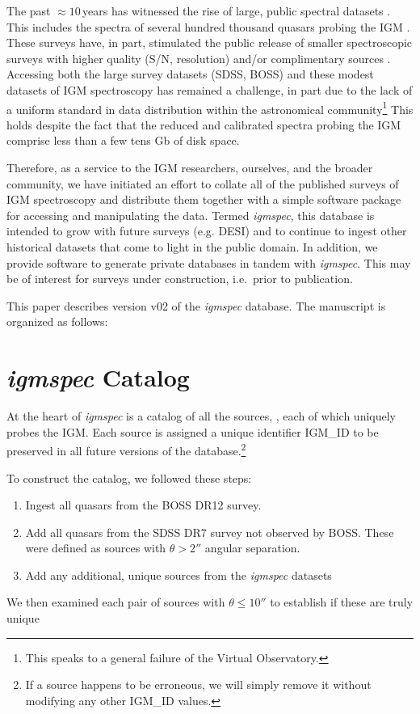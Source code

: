 \documentclass[12pt,preprint]{aastex}
\begin{document}
The past $\approx 10$\,years has witnessed the
rise of large, public spectral datasets \citep{york,2dF}.
This includes the spectra of several hundred thousand quasars
probing the IGM \citep{sdss_dr7Q,boss_dr12Q}.
These surveys have, in part, stimulated the public release
of smaller spectroscopic surveys with higher quality
(S/N, resolution) and/or complimentary sources
\citep[e.g.][]{pro07,hdlls}.
Accessing both the large survey datasets (SDSS, BOSS)
and these modest datasets of IGM spectroscopy
has remained a challenge, in part due to the lack of a
uniform standard in data distribution within the astronomical
community\footnote{This speaks to a general failure of the
Virtual Observatory.}
This holds despite the fact that the reduced and calibrated
spectra probing the IGM comprise less than a few
tens Gb of disk space.

Therefore, as a service to the IGM researchers, ourselves, and the
broader community, we have initiated an effort to collate 
all of the published surveys of IGM spectroscopy and distribute
them together with a simple software package
for accessing and manipulating the data.  
Termed {\it igmspec}, this database
is intended to grow with future surveys (e.g. DESI)
and to continue to ingest other historical 
datasets that come to light in
the public domain.  In addition, we provide 
software to generate private databases in tandem
with {\it igmspec}.  This may be of interest for surveys 
under construction, i.e.\ prior to publication.

This paper describes version v02 of the {\it igmspec}
database.  The manuscript is organized as follows:



\section{{\it igmspec} Catalog}
\label{sec:catalog}

At the heart of {\it igmspec} is a catalog of all the sources,
, each of which uniquely probes the IGM.
Each source is assigned a unique identifier IGM\_ID to be
preserved in all future versions of the database.\footnote{If a source
happens to be erroneous, we will simply remove it without modifying
any other IGM\_ID values.}

To construct the catalog, we followed these steps:

\begin{enumerate}
\item Ingest all quasars from the BOSS DR12 survey.
\item Add all quasars from the SDSS DR7 survey not observed by BOSS.
These were defined as sources with $\theta > 2''$ angular separation.
\item Add any additional, unique sources from the {\it igmspec} datasets
\end{enumerate}
We then examined each pair of sources with $\theta \le 10''$ to establish
if these are truly unique
\end{document}
